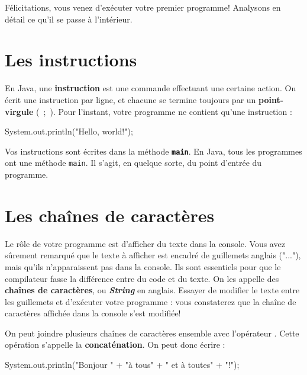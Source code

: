 \documentclass[12pt]{report}
\newcommand{\commande}[1]{%
\tcbox[on line, size=fbox, colframe=black, boxrule=0.75pt, tcbox raise base]{#1} %
}
\begin{document}
Félicitations, vous venez d'exécuter votre premier programme! Analysons en détail ce qu'il se passe à l'intérieur.






%
\section{Les instructions}
En Java, une \textbf{instruction} est une commande effectuant une certaine action. On écrit une instruction par ligne, et chacune se termine toujours par un \textbf{point-virgule} (\ {;}\ ). Pour l'instant, votre programme ne contient qu'une instruction : 
\begin{code}
System.out.println("Hello, world!");
\end{code}
Vos instructions sont écrites dans la méthode \texttt{\bfseries main}. En Java, tous les programmes ont une méthode \texttt{main}. Il s'agit, en quelque sorte, du point d'entrée du programme.





%
\section{Les chaînes de caractères}
%
Le rôle de votre programme est d'afficher du texte dans la console. Vous avez sûrement remarqué que le texte à afficher est encadré de guillemets anglais ("..."), mais qu'ils n'apparaissent pas dans la console. Ils sont essentiels pour que le compilateur fasse la différence entre du code et du texte. On les appelle des \textbf{chaînes de caractères}, ou \emph{\bfseries String} en anglais. Essayer de modifier le texte entre les guillemets et d'exécuter votre programme : vous constaterez que la chaîne de caractères affichée dans la console s'est modifiée!

On peut joindre plusieurs chaînes de caractères ensemble avec l'opérateur \commande{+}. Cette opération s'appelle la \textbf{concaténation}. On peut donc écrire :%
\begin{code}
System.out.println("Bonjour " + "à tous" + " et à toutes" + "!");
\end{code} 
\end{document}
